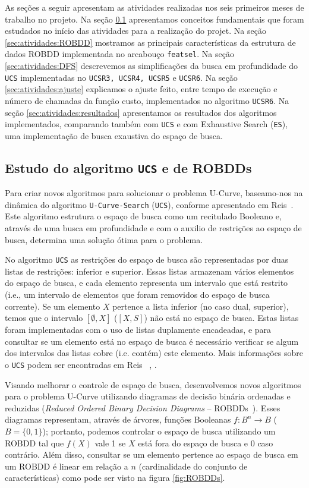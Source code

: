 \documentclass[12pt]{article}
\begin{document}
As seções a seguir apresentam as atividades realizadas nos seis primeiros meses de trabalho no projeto. Na seção \ref{sec:atividades:estudo} apresentamos conceitos fundamentais que foram estudados no início das atividades para a realização do projet. Na seção \ref{sec:atividades:ROBDD} mostramos as principais características da estrutura de dados ROBDD implementada no arcabouço {\tt featsel}. Na seção \ref{sec:atividades:DFS} descrevemos as simplificações da busca em profundidade do {\tt UCS} implementadas no {\tt UCSR3, UCSR4, UCSR5} e {\tt UCSR6}. Na seção \ref{sec:atividades:ajuste} explicamos o ajuste feito, entre tempo de execução e número de chamadas da função custo, implementados no algoritmo {\tt UCSR6}. Na seção \ref{sec:atividades:resultados} apresentamos os resultados dos algoritmos implementados, comparando também com {\tt UCS} e com Exhaustive Search ({\tt ES}), uma implementação de busca exaustiva do espaço de busca.


\subsection{Estudo do algoritmo {\tt UCS} e de ROBDDs}\label{sec:atividades:estudo}
Para criar novos algoritmos para solucionar o problema U-Curve, baseamo-nos na dinâmica do algoritmo {\tt U-Curve-Search} ({\tt UCS}), conforme apresentado em Reis~\cite{msreis thesis}. Este algoritmo estrutura o espaço de busca como um recitulado Booleano e, através de uma busca em profundidade e com o auxilio de restrições ao espaço de busca, determina uma solução ótima para o problema. 

No algoritmo {\tt UCS} as restrições do espaço de busca são representadas por duas listas de restrições: inferior e superior. Essas listas armazenam vários elementos do espaço de busca, e cada elemento representa um intervalo que está restrito (i.e., um intervalo de elementos que foram removidos do espaço de busca corrente). Se um elemento $X$ pertence a lista inferior (no caso dual, superior), temos que o intervalo $[\emptyset, X]$ ($[X, S]$) não está no espaço de busca. Estas listas foram implementadas com o uso de listas duplamente encadeadas, e para consultar se um elemento está no espaço de busca é necessário verificar se algum dos intervalos das listas cobre (i.e. contém) este elemento. Mais informações sobre o {\tt UCS} podem ser encontradas em Reis ~\cite{msreis thesis}, \cite{ucs paper}.

Visando melhorar o controle de espaço de busca, desenvolvemos novos algoritmos para o problema U-Curve utilizando diagramas de decisão binária ordenadas e reduzidas ({\em Reduced Ordered Binary Decision Diagrams} -- ROBDDs~\cite{bryant}). Esses diagramas representam, através de árvores, funções Booleanas $f:B^{n} \rightarrow B$ ($B = \{0, 1\}$); portanto, podemos controlar o espaço de busca utilizando um ROBDD tal que $f(X)$ vale 1 se $X$ está fora do espaço de busca e 0 caso contrário. Além disso, consultar se um elemento pertence ao espaço de busca em um ROBDD é linear em relação a $n$ (cardinalidade do conjunto de características) como pode ser visto na figura \ref{fig:ROBDDs}.
\end{document}
